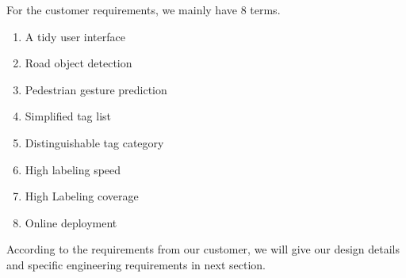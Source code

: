 For the customer requirements, we mainly have 8 terms. 
\begin{enumerate}
    \item A tidy user interface
    \item Road object detection
    \item Pedestrian gesture prediction
    \item Simplified tag list
    \item Distinguishable tag category
    \item High labeling speed
    \item High Labeling coverage
    \item Online deployment
\end{enumerate}
According to the requirements from our customer, we will give our design details and specific engineering requirements in next section. 